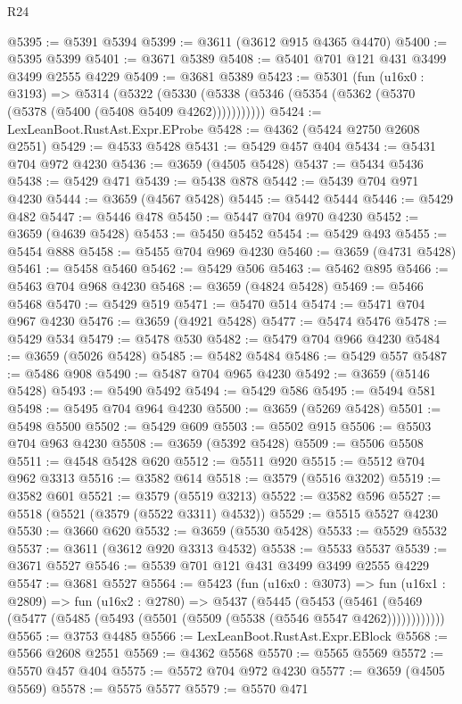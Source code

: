 \begin{lexlean}{R24}
\begin{coremodule}
@5395 := @5391 @5394
@5399 := @3611 (@3612 @915 @4365 @4470)
@5400 := @5395 @5399
@5401 := @3671 @5389
@5408 := @5401 @701 @121 @431 @3499 @3499 @2555 @4229
@5409 := @3681 @5389
@5423 := @5301
    (fun (u16x0 : @3193) =>
    @5314
      (@5322 (@5330 (@5338 (@5346 (@5354 (@5362 (@5370 (@5378 (@5400 (@5408 @5409 @4262)))))))))))
@5424 := LexLeanBoot.RustAst.Expr.EProbe
@5428 := @4362 (@5424 @2750 @2608 @2551)
@5429 := @4533 @5428
@5431 := @5429 @457 @404
@5434 := @5431 @704 @972 @4230
@5436 := @3659 (@4505 @5428)
@5437 := @5434 @5436
@5438 := @5429 @471
@5439 := @5438 @878
@5442 := @5439 @704 @971 @4230
@5444 := @3659 (@4567 @5428)
@5445 := @5442 @5444
@5446 := @5429 @482
@5447 := @5446 @478
@5450 := @5447 @704 @970 @4230
@5452 := @3659 (@4639 @5428)
@5453 := @5450 @5452
@5454 := @5429 @493
@5455 := @5454 @888
@5458 := @5455 @704 @969 @4230
@5460 := @3659 (@4731 @5428)
@5461 := @5458 @5460
@5462 := @5429 @506
@5463 := @5462 @895
@5466 := @5463 @704 @968 @4230
@5468 := @3659 (@4824 @5428)
@5469 := @5466 @5468
@5470 := @5429 @519
@5471 := @5470 @514
@5474 := @5471 @704 @967 @4230
@5476 := @3659 (@4921 @5428)
@5477 := @5474 @5476
@5478 := @5429 @534
@5479 := @5478 @530
@5482 := @5479 @704 @966 @4230
@5484 := @3659 (@5026 @5428)
@5485 := @5482 @5484
@5486 := @5429 @557
@5487 := @5486 @908
@5490 := @5487 @704 @965 @4230
@5492 := @3659 (@5146 @5428)
@5493 := @5490 @5492
@5494 := @5429 @586
@5495 := @5494 @581
@5498 := @5495 @704 @964 @4230
@5500 := @3659 (@5269 @5428)
@5501 := @5498 @5500
@5502 := @5429 @609
@5503 := @5502 @915
@5506 := @5503 @704 @963 @4230
@5508 := @3659 (@5392 @5428)
@5509 := @5506 @5508
@5511 := @4548 @5428 @620
@5512 := @5511 @920
@5515 := @5512 @704 @962 @3313
@5516 := @3582 @614
@5518 := @3579 (@5516 @3202)
@5519 := @3582 @601
@5521 := @3579 (@5519 @3213)
@5522 := @3582 @596
@5527 := @5518 (@5521 (@3579 (@5522 @3311) @4532))
@5529 := @5515 @5527 @4230
@5530 := @3660 @620
@5532 := @3659 (@5530 @5428)
@5533 := @5529 @5532
@5537 := @3611 (@3612 @920 @3313 @4532)
@5538 := @5533 @5537
@5539 := @3671 @5527
@5546 := @5539 @701 @121 @431 @3499 @3499 @2555 @4229
@5547 := @3681 @5527
@5564 := @5423
    (fun (u16x0 : @3073) =>
    fun (u16x1 : @2809) =>
    fun (u16x2 : @2780) =>
    @5437
      (@5445
        (@5453
          (@5461 (@5469 (@5477 (@5485 (@5493 (@5501 (@5509 (@5538 (@5546 @5547 @4262))))))))))))
@5565 := @3753 @4485
@5566 := LexLeanBoot.RustAst.Expr.EBlock
@5568 := @5566 @2608 @2551
@5569 := @4362 @5568
@5570 := @5565 @5569
@5572 := @5570 @457 @404
@5575 := @5572 @704 @972 @4230
@5577 := @3659 (@4505 @5569)
@5578 := @5575 @5577
@5579 := @5570 @471

\end{coremodule}
\end{lexlean}
